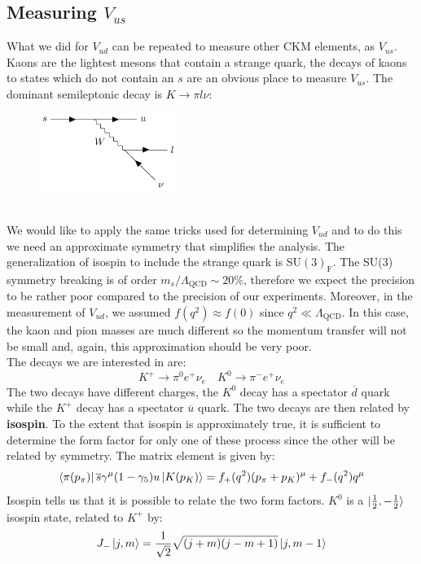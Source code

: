 \documentclass[../main.tex]{subfiles}
\begin{document}
\subsection{Measuring $V_{us}$}
What we did for $V_{ud}$ can be repeated to measure other CKM elements, as $V_{us}$. Kaons are the lightest mesons that contain a strange quark, the decays of kaons to states which do not contain an $s$ are an obvious place to measure $V_{us}$. The dominant semileptonic decay is $K\to\pi l\nu$:\\
\begin{figure}[h]
    \centering
    \includegraphics[width=0.4\textwidth]{Images/kaondecay.pdf}
    \caption*{}
\end{figure}\\
We would like to apply the same tricks used for determining $V_{ud}$ and to do this we need an approximate symmetry that simplifies the analysis. The generalization of isospin to include the strange quark is SU$(3)_{\text{F}}$. The SU(3) symmetry breaking is of order $m_s/\Lambda_{\text{QCD}}\sim20\%$, therefore we expect the precision to be rather poor compared to the precision of our experiments. Moreover, in the measurement of $V_{ud}$, we assumed $f(q^2)\approx f(0)$ since $q^2\ll\Lambda_{\text{QCD}}$. In this case, the kaon and pion masses are much different so the momentum transfer will not be small and, again, this approximation should be very poor.\\
The decays we are interested in are:
\[
K^+\to\pi^0e^+\nu_e \quad K^0\to\pi^-e^+\nu_e
\]
The two decays have different charges, the $K^0$ decay has a spectator $\overline{d}$ quark while the $K^+$ decay has a spectator $\overline{u}$ quark. The two decays are then related by \textbf{isospin}. To the extent that isospin is approximately true, it is sufficient to determine the form factor for only one of these process since the other will be related by symmetry. The matrix element is given by:
\[
\bra{\pi(p_\pi)}\overline{s}\gamma^\mu(1-\gamma_5)u\ket{K(p_K)}=f_+(q^2)(p_\pi+p_K)^\mu+f_-(q^2)q^\mu
\]
Isospin tells us that it is possible to relate the two form factors. $K^0$ is a $\ket{\frac{1}{2},-\frac{1}{2}}$ isospin state, related to $K^+$ by:
\[
J_-\ket{j,m}=\frac{1}{\sqrt{2}}\sqrt{(j+m)(j-m+1)}\ket{j,m-1}
\]
\end{document}
